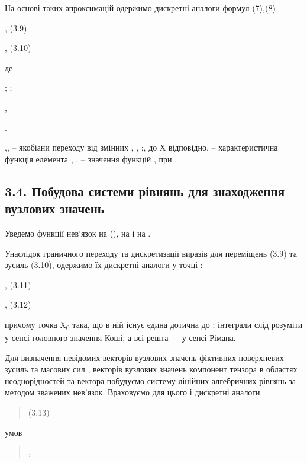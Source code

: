 На основі таких апроксимацій одержимо дискретні аналоги формул (7),(8)

, (3.9)

, (3.10)

де

; ;

,

.

,, -- якобіани переходу від змінних , , ;, до Х відповідно. --
характеристична функція елемента , , -- значення функцій , при .

\hypertarget{ux43fux43eux431ux443ux434ux43eux432ux430-ux441ux438ux441ux442ux435ux43cux438-ux440ux456ux432ux43dux44fux43dux44c-ux434ux43bux44f-ux437ux43dux430ux445ux43eux434ux436ux435ux43dux43dux44f-ux432ux443ux437ux43bux43eux432ux438ux445-ux437ux43dux430ux447ux435ux43dux44c-1}{%
\subsection{\texorpdfstring{3.4. Побудова системи рівнянь для
знаходження вузлових значень
}{3.4. Побудова системи рівнянь для знаходження вузлових значень }}\label{ux43fux43eux431ux443ux434ux43eux432ux430-ux441ux438ux441ux442ux435ux43cux438-ux440ux456ux432ux43dux44fux43dux44c-ux434ux43bux44f-ux437ux43dux430ux445ux43eux434ux436ux435ux43dux43dux44f-ux432ux443ux437ux43bux43eux432ux438ux445-ux437ux43dux430ux447ux435ux43dux44c-1}}

Уведемо функції нев'язок на (), на і на .

Унаслідок граничного переходу та дискретизації виразів для переміщень
(3.9) та зусиль (3.10), одержимо їх дискретні аналоги у точці :

, (3.11)

, (3.12)

причому точка X\textsubscript{0} така, що в ній існує єдина дотична до ;
інтеграли слід розуміти у сенсі головного значення Коші, а всі решта ---
у сенсі Рімана.

Для визначення невідомих векторів вузлових значень фіктивних поверхневих
зусиль та масових сил , векторів вузлових значень компонент тензора в
областях неоднорідностей та вектора побудуємо систему лінійних
алгебричних рівнянь за методом зважених нев'язок. Враховуємо для цього і
дискретні аналоги

\begin{quote}
(3.13)
\end{quote}

умов

\begin{quote}
,
\end{quote}

